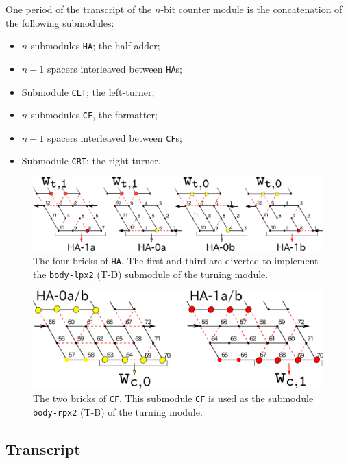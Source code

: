 \documentclass[runningheads]{llncs}
\begin{document}
One period of the transcript of the $n$-bit counter module is the concatenation of the following submodules: 
\begin{itemize}
\item $n$ submodules \texttt{HA}; the half-adder; 
\item $n-1$ spacers interleaved between \texttt{HA}s; 
\item Submodule \texttt{CLT}; the left-turner; 
\item $n$ submodules \texttt{CF}, the formatter; 
\item $n-1$ spacers interleaved between \texttt{CF}s; 
\item Submodule \texttt{CRT}; the right-turner.
\end{itemize}


\begin{figure}[htb]
\centering
\includegraphics[width=\linewidth]{Figs/counter_zig.png}
\caption{The four bricks of \texttt{HA}.
The first and third are diverted to implement the \texttt{body-lpx2} (T-D) submodule of the turning module. 
}
\label{fig:half-adder}
\end{figure}

\begin{figure}[htb]
\centering
\includegraphics[width=0.66\linewidth]{Figs/counter_zag.png}
\caption{The two bricks of \texttt{CF}.
This submodule \texttt{CF} is used as the submodule \texttt{body-rpx2} (T-B) of the turning module. 
}
\label{fig:half-adder}
\end{figure}



	\subsection{Transcript}
\end{document}
